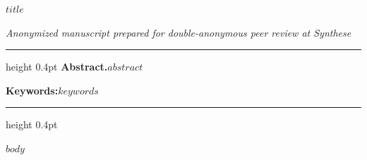 \documentclass[11pt,a4paper]{article}
\begin{document}
\thispagestyle{plain}
\nolinenumbers
\begin{flushleft}
{\fontsize{17.5}{22}\selectfont\bfseries $title$\par}
\vspace{8pt}
{\small\emph{Anonymized manuscript prepared for double-anonymous peer review at Synthese}\par}
\end{flushleft}
\vspace{6pt}
\hrule height 0.4pt
\vspace{8pt}
\linenumbers
\noindent\textbf{Abstract.}\quad $abstract$\par
\vspace{6pt}
\noindent\textbf{Keywords:}\quad $keywords$\par
\vspace{8pt}
\hrule height 0.4pt
\vspace{12pt}

$body$

\clearpage
\begingroup
\nolinenumbers
{}
\small
\setlength{\bibsep}{5pt}


\endgroup
\end{document}
